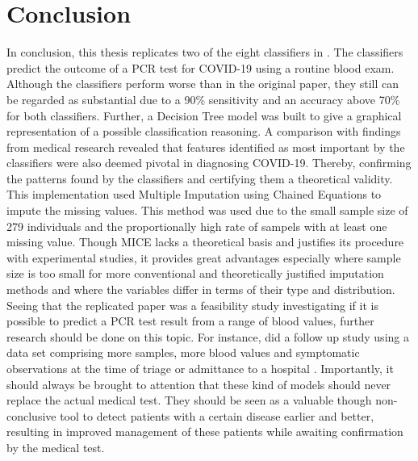 \section{Conclusion}
In conclusion, this thesis replicates two of the eight classifiers in 
\cite{RN127}. The classifiers predict the outcome of a PCR test for COVID-19 
using a routine blood exam. Although the classifiers perform worse than in the 
original paper, they still can be regarded as substantial due to a 90\% 
sensitivity and an accuracy above 70\% for both classifiers.
Further, a Decision Tree model was built to give a graphical representation of 
a possible classification reasoning.
A comparison with findings from medical research revealed that features 
identified as most important by the classifiers were also deemed pivotal in 
diagnosing COVID-19. Thereby, confirming the patterns found by the classifiers 
and certifying them a theoretical validity.
This implementation used Multiple Imputation using Chained Equations to impute 
the missing values. This method was used due to the small sample size of 279 
individuals and the proportionally high rate of sampels with at least one 
missing value. Though MICE lacks a theoretical basis and justifies its 
procedure with experimental studies, it provides great advantages especially 
where sample size is too small for more conventional and theoretically 
justified imputation methods and where the variables differ in terms of their 
type and distribution.
Seeing that the replicated paper was a feasibility study investigating if it is 
possible to predict a PCR test result from a range of blood values, further 
research should be done on this topic. For instance, \citeauthor{RN127} did a 
follow up study using a data set comprising more samples, more blood values and 
symptomatic observations at the time of triage or admittance to a hospital 
\cite{RN179}.
Importantly, it should always be brought to attention that these kind of models 
should never replace the actual medical test. They should be seen as a valuable 
though non-conclusive tool to detect patients with a certain disease earlier 
and better, resulting in improved management of these patients while awaiting 
confirmation by the medical test.
